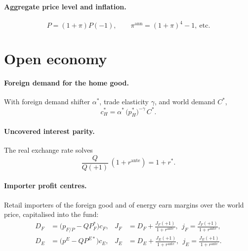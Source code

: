 \documentclass[11pt]{article}
\newcommand{\pE}{p^{E}}
\begin{document}
\paragraph{Aggregate price level and inflation.}
\begin{equation}
P=(1+\pi)P(-1),\qquad
\pi^{\text{ann}}=(1+\pi)^4-1,\ \text{etc.}
\end{equation}

\section{Open economy}\label{sec:open}

\paragraph{Foreign demand for the home good.} With foreign demand shifter
$\alpha^{*}$, trade elasticity $\gamma$, and world demand $C^{*}$,
\begin{equation}
c_H^{*}=\alpha^{*}\,\bigl(p_H^{*}\bigr)^{-\gamma}\,C^{*}.
\end{equation}

\paragraph{Uncovered interest parity.} The real exchange rate solves
\begin{equation}
\frac{Q}{Q(+1)}\,(1+r^{\text{ante}})=1+r^{*}. \label{eq:uip}
\end{equation}

\paragraph{Importer profit centres.} Retail importers of the foreign good and of
energy earn margins over the world price, capitalised into the fund:
\begin{align}
D_F &= \bigl(p_{F/P}-Q P^{*}_{F}\bigr)c_F, & J_F&=D_F+\frac{J_F(+1)}{1+r^{\text{ante}}},\ \ j_F=\frac{J_F(+1)}{1+r^{\text{ante}}},\\
D_E &= \bigl(\pE-Q P^{E*}\bigr)c_E, & J_E&=D_E+\frac{J_E(+1)}{1+r^{\text{ante}}},\ \ j_E=\frac{J_E(+1)}{1+r^{\text{ante}}}.
\end{align}
\end{document}
